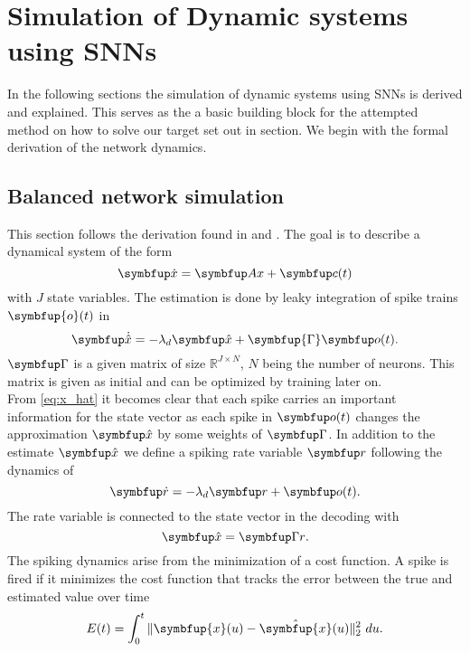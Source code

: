 \section{Simulation of Dynamic systems using \acp{SNN}}\label{sec:simulation}
In the following sections the simulation of dynamic systems using \acp{SNN} is derived and explained. This serves as the a basic building block for the attempted method on how to solve our target set out in section. We begin with the formal derivation of the network dynamics.

\subsection{Balanced network simulation}\label{ssec:balanced_network_sim}

This section follows the derivation found in \cite{boerlin_predictive_2013} and \cite{huang_dynamics_2019}.
The goal is to describe a dynamical system of the form
\begin{equation}\label{eq:x}
\bmu{\dot{x}} = \bmu{Ax} + \bmu{c}(t)
\end{equation}
with $J$ state variables.
The estimation is done by leaky integration of spike trains $\symbfup{o}(t)$ in
\begin{equation}\label{eq:x_hat}
\bmu{\dot{\hat{x}}} = -\lambda_d \bmu{\hat{x}} + \symbfup{\Gamma} \bmu{o}(t).
\end{equation}
$\bmu{\Gamma}$ is a given matrix of size $\mathbb{R}^{J\times N}$, $N$ being the number of neurons. This matrix is given as initial and can be optimized by training later on\cite{brendel_learning_2020}.\\
From \cref{eq:x_hat} it becomes clear that each spike carries an important information for the state vector as each spike in $\bmu{o}(t)$ changes the approximation $\bmu{\hat{x}}$ by some weights of $\bmu{\Gamma}$.
In addition to the estimate $\bmu{\hat{x}}$ we define a spiking rate variable $\bmu{r}$ following the dynamics of
\begin{equation}\label{eq:rate}
\bmu{\dot{r}} = -\lambda_d\bmu{r} + \bmu{o}(t).
\end{equation}
The rate variable is connected to the state vector in the decoding with
\begin{equation}\label{eq:decoding}
	\bmu{\hat{x}} = \bmu{\Gamma r}.
\end{equation}
The spiking dynamics arise from the minimization of a cost function. A spike is fired if it minimizes the cost function that tracks the error between the true and estimated value over time
\begin{equation}\label{eq:cost_func_basic}
E(t)=\int_0^t \|\symbfup{x}(u)-\hat{\symbfup{x}}(u)\|_2^2 \ du.
\end{equation}


